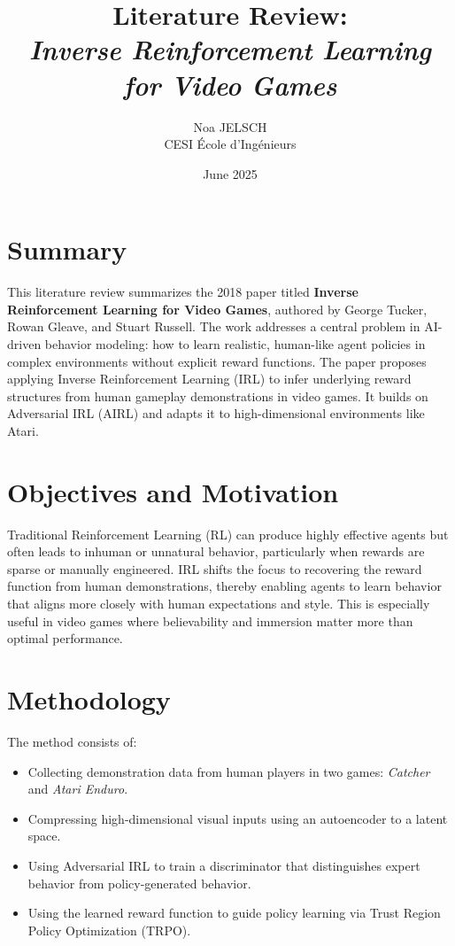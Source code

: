 \documentclass[12pt,a4paper]{article}
\title{Literature Review:\\\textit{Inverse Reinforcement Learning for Video Games}}
\author{Noa JELSCH\\CESI École d’Ingénieurs}
\date{June 2025}
\begin{document}
\maketitle

\section*{Summary}

This literature review summarizes the 2018 paper titled \textbf{Inverse Reinforcement Learning for Video Games}, authored by George Tucker, Rowan Gleave, and Stuart Russell. The work addresses a central problem in AI-driven behavior modeling: how to learn realistic, human-like agent policies in complex environments without explicit reward functions. The paper proposes applying Inverse Reinforcement Learning (IRL) to infer underlying reward structures from human gameplay demonstrations in video games. It builds on Adversarial IRL (AIRL) and adapts it to high-dimensional environments like Atari.

\section*{Objectives and Motivation}

Traditional Reinforcement Learning (RL) can produce highly effective agents but often leads to inhuman or unnatural behavior, particularly when rewards are sparse or manually engineered. IRL shifts the focus to recovering the reward function from human demonstrations, thereby enabling agents to learn behavior that aligns more closely with human expectations and style. This is especially useful in video games where believability and immersion matter more than optimal performance.

\section*{Methodology}

The method consists of:
\begin{itemize}
  \item Collecting demonstration data from human players in two games: \textit{Catcher} and \textit{Atari Enduro}.
  \item Compressing high-dimensional visual inputs using an autoencoder to a latent space.
  \item Using Adversarial IRL to train a discriminator that distinguishes expert behavior from policy-generated behavior.
  \item Using the learned reward function to guide policy learning via Trust Region Policy Optimization (TRPO).
\end{itemize}
\end{document}
